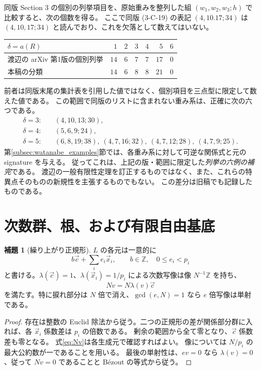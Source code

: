\documentclass[11pt,a4paper]{ltjsarticle}
\numberwithin{equation}{section}
\theoremstyle{definition}
\newtheorem{lemma}[theorem]{補題}
\newcommand{\Z}{\mathbb Z}\newcommand{\N}{\mathbb N}\newcommand{\Q}{\mathbb Q}\newcommand{\C}{\mathbb C}
\newcommand{\cc}{\vec c}\newcommand{\xx}{\vec x}\newcommand{\om}{\vec\omega}\newcommand{\ta}{\vec\tau}
\begin{document}
同版 Section 3 の個別の列挙項目を、原始重みを整列した組 $(w_1,w_2,w_3;h)$ で比較すると、次の個数を得る。
ここで同版 (3-C-19) の表記 $(4,10.17;34)$ は $(4,10,17;34)$ と読んでおり、これを欠落として数えてはいない。
\begin{center}
\begin{tabular}{lrrrrrr}
\toprule
$\delta=a(R)$ & $1$ & $2$ & $3$ & $4$ & $5$ & $6$\\
\midrule
渡辺の arXiv 第1版の個別列挙 & $14$ & $6$ & $7$ & $7$ & $17$ & $0$\\
本稿の分類 & $14$ & $6$ & $8$ & $8$ & $21$ & $0$\\
\bottomrule
\end{tabular}
\end{center}
前者は同版末尾の集計表を引用した値ではなく、個別項目を三点型に限定して数えた値である。
この範囲で同版のリストに含まれない重み系は、正確に次の六つである。
\begin{equation}\label{eq:watanabe_six}
\begin{aligned}
 \delta=3:&\quad(4,10,13;30),\\
 \delta=4:&\quad(5,6,9;24),\\
 \delta=5:&\quad(6,8,19;38),\ (4,7,16;32),\ (4,7,12;28),\ (4,7,9;25).
\end{aligned}
\end{equation}
第\ref{subsec:watanabe_examples}節では、各重み系に対して可逆な関係式と元の signature を与える。
従ってこれは、上記の版・範囲に限定した\emph{列挙の六例の補完}である。
渡辺の一般有限性定理を訂正するものではなく、また、これらの特異点そのものの新規性を主張するものでもない。
この差分は旧稿\cite[Remark 1.5, Remark 6.3]{v04}でも記録したものである。

\section{次数群、根、および有限自由基底}\label{sec:arithmetic}
\begin{lemma}[繰り上がり正規形]\label{lem:nf}
$L$ の各元は一意的に
\[
 b\cc+\sum_i e_i\xx_i,\qquad b\in\Z,\quad0\le e_i<p_i
\]
と書ける。$\lambda(\cc)=1$、$\lambda(\xx_i)=1/p_i$ による次数写像は像 $N^{-1}\Z$ を持ち、
\begin{equation}\label{eq:Nv}
 Nv=N\lambda(v)\cc
\end{equation}
を満たす。特に捩れ部分は $N$ 倍で消え、$\gcd(e,N)=1$ なら $e$ 倍写像は単射である。
\end{lemma}
\begin{proof}
存在は整数の Euclid 除法から従う。二つの正規形の差が関係部分群に入れば、各 $\xx_i$ 係数差は $p_i$ の倍数である。
剰余の範囲から全て零となり、$\cc$ 係数差も零となる。
式\eqref{eq:Nv}は各生成元で確認すればよい。
像については $N/p_i$ の最大公約数が一であることを用いる。
最後の単射性は、$ev=0$ なら $\lambda(v)=0$、従って $Nv=0$ であることと Bézout の等式から従う。
\end{proof}
\end{document}
